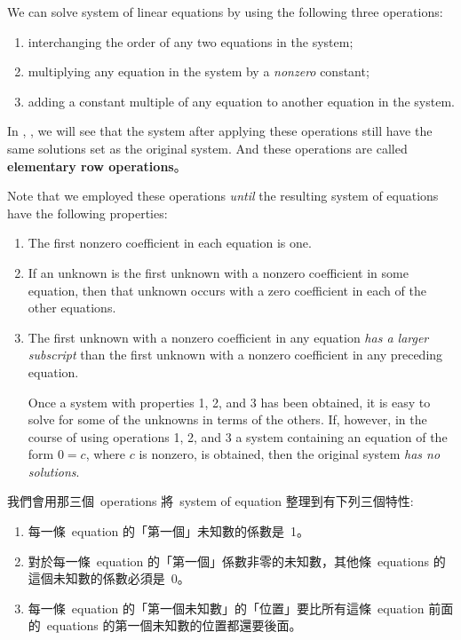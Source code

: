 \begin{remark} \label{remark 1.4.1}
We can solve system of linear equations by using the following three operations:
\begin{enumerate}
    \item interchanging the order of any two equations in the system; 
    \item multiplying any equation in the system by a \emph{nonzero} constant;
    \item adding a constant multiple of any equation to another equation in the system.
\end{enumerate}
In , , we will see that the system after applying these operations still have the same solutions set as the original system.
And these operations are called \textbf{elementary row operations}。

Note that we employed these operations \emph{until} the resulting system of equations have the following properties:
\begin{enumerate}
\item The first nonzero coefficient in each equation is one.
\item If an unknown is the first unknown with a nonzero coefficient in some equation, then that unknown occurs with a zero coefficient in each of the other equations.
\item The first unknown with a nonzero coefficient in any equation \emph{has a larger subscript} than the first unknown with a nonzero coefficient in any preceding equation.

Once a system with properties 1, 2, and 3 has been obtained, it is easy to solve for some of the unknowns in terms of the others.
If, however, in the course of using operations 1, 2, and 3 a system containing an equation of the form \(0 = c\), where \(c\) is nonzero, is obtained, then the original system \emph{has no solutions}.
\end{enumerate}
\end{remark}

\begin{note}
我們會用那三個\ operations 將\ system of equation 整理到有下列三個特性:
\begin{enumerate}
\item 每一條\ equation 的「第一個」未知數的係數是\ 1。
\item 對於每一條\ equation 的「第一個」係數非零的未知數，其他條\ equations 的這個未知數的係數必須是\ 0。
\item 每一條\ equation 的「第一個未知數」的「位置」要比所有這條\ equation 前面的\ equations 的第一個未知數的位置都還要後面。
\end{enumerate}
\end{note}

